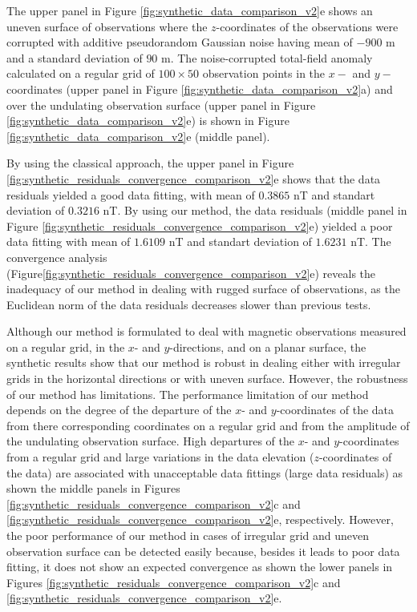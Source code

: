 
The upper panel in Figure \ref{fig:synthetic_data_comparison_v2}e shows an uneven surface of observations where  the $z$-coordinates of the observations were corrupted with additive pseudorandom Gaussian noise having mean of  $- 900$ m  and a standard deviation of $90$ m.
The noise-corrupted total-field anomaly calculated on a regular grid  of $100 \times 50$ observation points in the $x-$ and $y-$coordinates (upper panel in Figure  \ref{fig:synthetic_data_comparison_v2}a) and
over the undulating observation surface (upper panel in Figure \ref{fig:synthetic_data_comparison_v2}e)
is shown in Figure \ref{fig:synthetic_data_comparison_v2}e (middle panel).

By using the classical approach, the upper panel in 
Figure \ref{fig:synthetic_residuals_convergence_comparison_v2}e shows that the data residuals 
yielded a good data fitting, with  mean of $0.3865$ nT and standart deviation of $0.3216$ nT. 
By using our method,  the data residuals (middle panel in 
Figure \ref{fig:synthetic_residuals_convergence_comparison_v2}e) yielded a poor data  fitting with mean of $1.6109$ nT and standart deviation of $1.6231$ nT.
The convergence analysis (Figure\ref{fig:synthetic_residuals_convergence_comparison_v2}e)
reveals the inadequacy of our method in dealing with rugged  surface of observations, as 
the Euclidean norm of the data residuals decreases slower than previous tests. 

Although our method is formulated to deal with magnetic observations measured on a regular grid, in 
the $x$- and $y$-directions, and on a planar surface, the synthetic results show that our method is 
robust in dealing either with irregular grids in the horizontal directions or with uneven surface.
However, the robustness of our method has limitations.
The performance limitation of our method depends on the degree of the 
departure of the $x$- and $y$-coordinates of the data from there corresponding coordinates on a regular grid
and from the amplitude of the undulating observation surface.
High departures of the $x$- and $y$-coordinates  from a regular grid and large variations in the data elevation ($z$-coordinates of the data) are associated with unacceptable data fittings (large data residuals) as shown the middle panels in Figures \ref{fig:synthetic_residuals_convergence_comparison_v2}c and \ref{fig:synthetic_residuals_convergence_comparison_v2}e, respectively.
However, the poor performance of our method in cases of irregular grid and uneven observation surface can be detected easily because, besides it leads to poor data fitting, it does not show an expected convergence as shown the lower panels in Figures \ref{fig:synthetic_residuals_convergence_comparison_v2}c  and \ref{fig:synthetic_residuals_convergence_comparison_v2}e.

